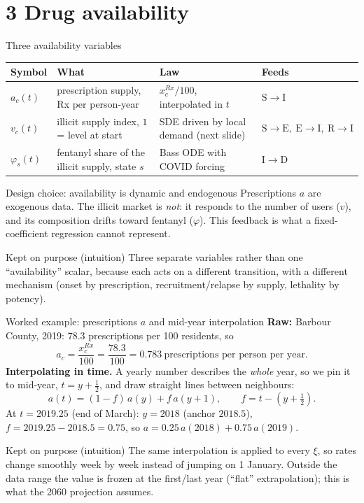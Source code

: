 ﻿\documentclass[9pt,aspectratio=169]{beamer}
\newenvironment{kept}{\begin{exampleblock}{Kept on purpose (intuition)}\small}{\end{exampleblock}}
\newcommand{\Sc}{\mathrm{S}}\newcommand{\Ec}{\mathrm{E}}\newcommand{\Ic}{\mathrm{I}}\newcommand{\Rc}{\mathrm{R}}\newcommand{\Dc}{\mathrm{D}}
\begin{document}
\section{3 Drug availability}
\begin{frame}{Three availability variables}
 \begin{tabularx}{\textwidth}{@{}l X X l@{}}
 \toprule
 Symbol & What & Law & Feeds\\\midrule
 $a_c(t)$ & prescription supply, Rx per person-year & $x^{Rx}_c/100$, interpolated in $t$ & $\Sc\to\Ic$\\[3pt]
 $v_c(t)$ & illicit supply index, $1$ = level at start & SDE driven by local demand (next slide) & $\Sc\to\Ec,\ \Ec\to\Ic,\ \Rc\to\Ic$\\[3pt]
 $\varphi_s(t)$ & fentanyl share of the illicit supply, state $s$ & Bass ODE with COVID forcing & $\Ic\to\Dc$\\
 \bottomrule
 \end{tabularx}
 \vspace{6pt}
 \begin{block}{Design choice: availability is dynamic and endogenous}\small
  Prescriptions $a$ are exogenous data. The illicit market is \emph{not}: it responds to the number of users ($v$), and its composition drifts toward fentanyl ($\varphi$). This feedback is what a fixed-coefficient regression cannot represent.
 \end{block}
 \begin{kept}
  Three separate variables rather than one ``availability'' scalar, because each acts on a different transition, with a different mechanism (onset by prescription, recruitment/relapse by supply, lethality by potency).
 \end{kept}
\end{frame}


\begin{frame}{Worked example: prescriptions $a$ and mid-year interpolation}
 \textbf{Raw:} Barbour County, 2019: $78.3$ prescriptions per 100 residents, so
 \[ a_c=\frac{x^{Rx}_c}{100}=\frac{78.3}{100}=0.783\ \text{prescriptions per person per year.}\]
 \textbf{Interpolating in time.} A yearly number describes the \emph{whole} year, so we pin it to mid-year, $t=y+\tfrac12$, and draw straight lines between neighbours:
 \[
  a(t)=(1-f)\,a(y)+f\,a(y+1),\qquad f=t-(y+\tfrac12).
 \]
 At $t=2019.25$ (end of March): $y=2018$ (anchor $2018.5$), $f=2019.25-2018.5=0.75$, so $a=0.25\,a(2018)+0.75\,a(2019)$.
 \begin{kept}
  The same interpolation is applied to every $\xi$, so rates change smoothly week by week instead of jumping on 1 January. Outside the data range the value is frozen at the first/last year (``flat'' extrapolation); this is what the 2060 projection assumes.
 \end{kept}
\end{frame}
\end{document}
